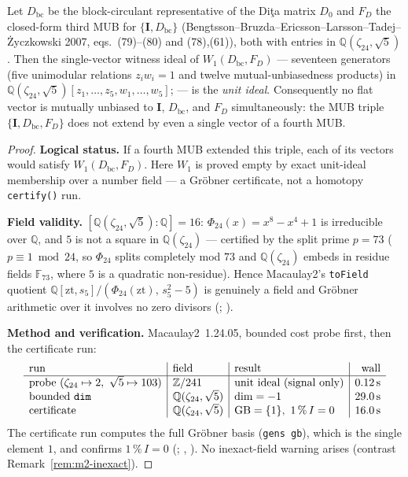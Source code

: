 \begin{theorem}
\label{thm:T4}
Let $D_{\mathrm{bc}}$ be the block-circulant representative of the Di\c{t}a matrix $D_0$ and $F_D$ the closed-form third MUB for $\{\mathbf{I},D_{\mathrm{bc}}\}$ (Bengtsson--Bruzda--Ericsson--Larsson--Tadej--\.Zyczkowski 2007, eqs.~(79)--(80) and (78),(61)), both with entries in $\mathbb{Q}(\zeta_{24},\sqrt{5})$.
Then the single-vector witness ideal of $W_1(D_{\mathrm{bc}},F_D)$ --- seventeen generators (five unimodular relations $z_iw_i=1$ and twelve mutual-unbiasedness products) in $\mathbb{Q}(\zeta_{24},\sqrt5)[z_1,\ldots,z_5,w_1,\ldots,w_5]$;  --- is the \emph{unit ideal}.
Consequently no flat vector is mutually unbiased to $\mathbf{I}$, $D_{\mathrm{bc}}$, and $F_D$ simultaneously: the MUB triple $\{\mathbf{I},D_{\mathrm{bc}},F_D\}$ does not extend by even a single vector of a fourth MUB.
\end{theorem}

\begin{proof}
\textbf{Logical status.}
If a fourth MUB extended this triple, each of its vectors would satisfy $W_1(D_{\mathrm{bc}},F_D)$. Here $W_1$ is proved empty by exact unit-ideal membership over a number field --- a Gr\"obner certificate, not a homotopy \texttt{certify()} run.

\textbf{Field validity.}
$[\mathbb{Q}(\zeta_{24},\sqrt5):\mathbb{Q}]=16$: $\Phi_{24}(x)=x^8-x^4+1$ is irreducible over $\mathbb{Q}$, and $5$ is not a square in $\mathbb{Q}(\zeta_{24})$ --- certified by the split prime $p=73$ ($p\equiv1\bmod 24$, so $\Phi_{24}$ splits completely mod $73$ and $\mathbb{Q}(\zeta_{24})$ embeds in residue fields $\mathbb{F}_{73}$, where $5$ is a quadratic non-residue).
Hence Macaulay2's \texttt{toField} quotient $\mathbb{Q}[\mathrm{zt},s_5]/(\Phi_{24}(\mathrm{zt}),\,s_5^2-5)$ is genuinely a field and Gr\"obner arithmetic over it involves no zero divisors (; ).

\textbf{Method and verification.}
Macaulay2~1.24.05, bounded cost probe first, then the certificate run:
\[
\begin{array}{l|l|l|r}
\text{run} & \text{field} & \text{result} & \text{wall}\\
\hline
\text{probe (}\zeta_{24}\mapsto2,\ \sqrt5\mapsto103\text{)} & \mathbb{Z}/241 & \text{unit ideal (signal only)} & 0.12\,\mathrm{s}\\
\text{bounded \texttt{dim}} & \mathbb{Q}(\zeta_{24},\sqrt5) & \dim = -1 & 29.0\,\mathrm{s}\\
\text{certificate} & \mathbb{Q}(\zeta_{24},\sqrt5) & \mathrm{GB}=\{1\},\ 1\,\%\,I = 0 & 16.0\,\mathrm{s}
\end{array}
\]
The certificate run computes the full Gr\"obner basis (\texttt{gens gb}), which is the single element $1$, and confirms $1\,\%\,I=0$ (; , ).
No inexact-field warning arises (contrast Remark~\ref{rem:m2-inexact}).
\end{proof}

